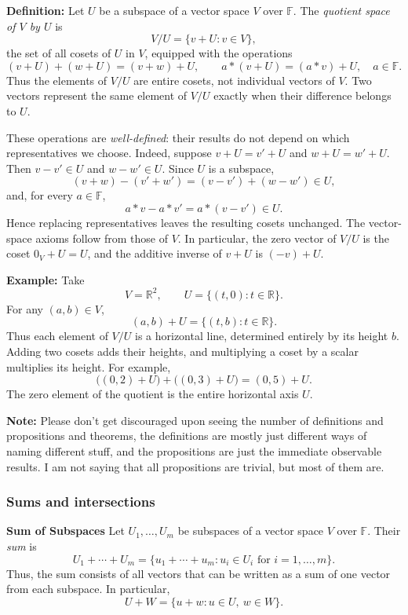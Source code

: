\documentclass[a4paper,11pt,abstract=true]{scrartcl}
\theoremstyle{dotlessP}
\theoremstyle{dotlessS}
\theoremstyle{remark}
\theoremstyle{definition}
\begin{document}
\textbf{Definition:} Let $U$ be a subspace of a vector
space $V$ over $\mathbb{F}$. The \emph{quotient space of $V$ by $U$} is
\[
V/U=\{v+U:v\in V\},
\]
the set of all cosets of $U$ in $V$, equipped with the operations
\[
(v+U)+(w+U)=(v+w)+U,
\qquad
a*(v+U)=(a*v)+U,\quad a\in\mathbb{F}.
\]
Thus the elements of $V/U$ are entire cosets, not individual vectors of $V$.
Two vectors represent the same element of $V/U$ exactly when their
difference belongs to $U$.

These operations are \emph{well-defined}: their results do not depend on
which representatives we choose. Indeed, suppose $v+U=v'+U$ and
$w+U=w'+U$. Then $v-v'\in U$ and $w-w'\in U$. Since $U$ is a subspace,
\[
(v+w)-(v'+w')=(v-v')+(w-w')\in U,
\]
and, for every $a\in\mathbb{F}$,
\[
a*v-a*v'=a*(v-v')\in U.
\]
Hence replacing representatives leaves the resulting cosets unchanged.
The vector-space axioms follow from those of $V$. In particular, the zero
vector of $V/U$ is the coset $0_V+U=U$, and the additive inverse of $v+U$
is $(-v)+U$.

\begin{example_box}
\textbf{Example:} Take
\[
V=\mathbb{R}^2,
\qquad U=\{(t,0):t\in\mathbb{R}\}.
\]
For any $(a,b)\in V$,
\[
(a,b)+U=\{(t,b):t\in\mathbb{R}\}.
\]
Thus each element of $V/U$ is a horizontal line, determined entirely by its
height $b$. Adding two cosets adds their heights, and multiplying a coset by
a scalar multiplies its height. For example,
\[
\bigl((0,2)+U\bigr)+\bigl((0,3)+U\bigr)=(0,5)+U.
\]
The zero element of the quotient is the entire horizontal axis $U$.
\end{example_box}

\textbf{Note:} Please don't get discouraged upon seeing the number of definitions and propositions and theorems, the definitions are mostly just different ways of naming different stuff, and the propositions are just the immediate observable results. I am not saying that all propositions are trivial, but most of them are. 

\subsubsection{Sums and intersections}
\begin{definition_box}
\textbf{Sum of Subspaces} Let $U_1,\ldots,U_m$ be subspaces of
a vector space $V$ over $\mathbb{F}$. Their \emph{sum} is
\[
U_1+\cdots+U_m
=\{u_1+\cdots+u_m:u_i\in U_i\text{ for }i=1,\ldots,m\}.
\]
Thus, the sum consists of all vectors that can be written as a sum of one
vector from each subspace. In particular,
\[
U+W=\{u+w:u\in U,\ w\in W\}.
\]
\end{definition_box}
\end{document}

